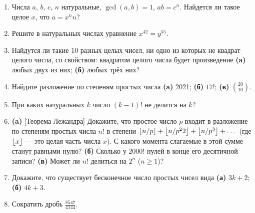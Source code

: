 \begin{enumerate}
\item Числа $a$, $b$, $c$, $n$ натуральные, $\gcd(a, b) = 1$, $ab = c^n$. Найдется ли
такое целое $x$, что $a = x^nn$?

\item Решите в натуральных числах уравнение $x^{42} = y^{55}$.
\item Найдутся ли такие 10 разных целых чисел, ни одно из которых
не квадрат целого числа, со свойством: квадратом целого числа
будет произведение \textbf{(a)} любых двух из них; \textbf{(б)} любых трёх них?

\item  Найдите разложение по степеням простых числа \textbf{(a)} 2021; \textbf{(б)} $17!$; \textbf{(в)} $\binom{20}{10}$.

\item При каких натуральных $k$ число $(k - 1)!$ не делится на $k$?

\item \textbf{(a)} [Теорема Лежандра] Докажите, что простое число $p$ входит
в разложение по степеням простых числа $n!$ в степени
$\left\lfloor n/p\right\rfloor+\left\lfloor n/p^22\right\rfloor+\left\lfloor n/p^3\right\rfloor+\dots$ (где $\left\lfloor x\right\rfloor$ --- это целая часть числа $x$).
С какого момента слагаемые в этой сумме станут равными нулю?
\textbf{(б)} Сколько у $2000!$ нулей в конце его десятичной записи? \textbf{(в)} Может
ли $n!$ делиться на $2^n$ ($n \ge 1$)?

\item Докажите, что существует бесконечное число простых чисел
вида \textbf{(а)} $3k + 2$; \textbf{(б)} $4k + 3$.

\item Сократить дробь $\frac{8547}{4144}$.

\end{enumerate}

